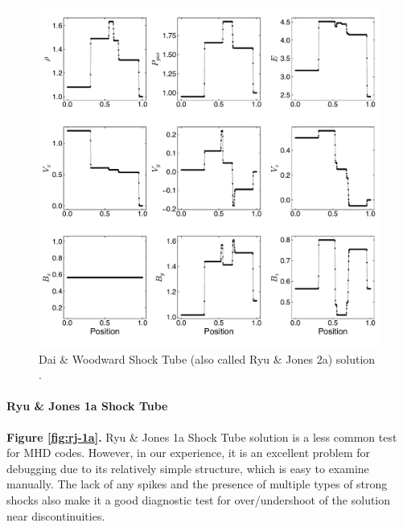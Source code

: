\documentclass[modern, linenumbers]{aastex631}
\newcommand*{\img}[1]{%
    \raisebox{-.3\baselineskip}{%
        \texttt{[image: \#1]}%
    }%
}
\begin{document}
\begin{figure}[ht!]
    \includegraphics[width=\linewidth]{d-and-w.pdf}
    \caption{Dai \& Woodward Shock Tube (also called Ryu \& Jones 2a) solution \citep{dai_woodward_1998, ryu_jones_1995}.
    \href{https://github.com/bcaddy/caddy-et-al-2023/blob/4c9c5ef905902e54e50943d0a261bd5b08342225/python/shock-tubes.py}{\img{github.png}}}
    \label{fig:dai-and-woodward}
\end{figure}

\paragraph{Ryu \& Jones 1a Shock Tube}
\textbf{Figure \ref{fig:rj-1a}.}
Ryu \& Jones 1a Shock Tube solution \citep{ryu_jones_1995} is a less common test for MHD codes. However, in our experience, it is an excellent problem for debugging due to its relatively simple structure, which is easy to examine manually. The lack of any spikes and the presence of multiple types of strong shocks also make it a good diagnostic test for over/undershoot of the solution near discontinuities.
\end{document}
